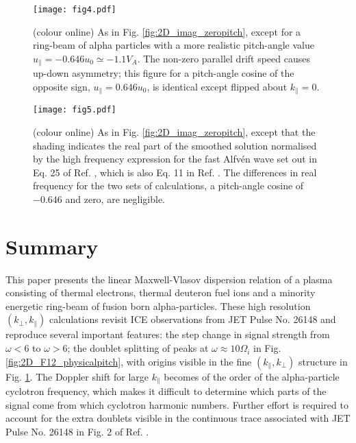 \documentclass[12pt]{iopart}
\begin{document}
\begin{figure}[ht!]
    \raggedleft
\texttt{[image: fig4.pdf]}
    \caption{(colour online) As in Fig. \ref{fig:2D_imag_zeropitch}, except for
    a ring-beam of alpha particles with a more realistic pitch-angle value
    $u_{\parallel} = -0.646 u_0 \simeq -1.1 V_A$. The non-zero parallel drift
    speed causes up-down asymmetry; this figure for a pitch-angle cosine of the
    opposite sign, $u_{\parallel} = 0.646 u_0$, is identical except flipped
    about $k_\parallel=0$.}
    \label{fig:2D_imag_physicalpitch}
\end{figure}


\begin{figure}[ht!]
    \raggedleft
\texttt{[image: fig5.pdf]}
    \caption{(colour online) As in Fig. \ref{fig:2D_imag_zeropitch}, except that
    the shading indicates the real part of the smoothed solution normalised by
    the high frequency expression for the fast Alfv{\'e}n wave set out in Eq. 25
    of Ref. \cite{Dendy1994}, which is also Eq. 11 in Ref.
    \cite{McClements1996}. The differences in real frequency for the two sets of
    calculations, a pitch-angle cosine of $-0.646$ and zero, are
    negligible.}
    \label{fig:2D_real_zeropitch}
\end{figure}

\section{Summary}

This paper presents the linear Maxwell-Vlasov dispersion relation of a plasma
consisting of thermal electrons, thermal deuteron fuel ions and a minority
energetic ring-beam of fusion born alpha-particles. These high resolution
$(k_\perp, k_\parallel)$ calculations revisit ICE observations from JET Pulse
No. 26148\cite{Cottrell1993,Dendy1995} and reproduce several important features:
the step change in signal strength from $\omega < 6$ to $\omega > 6$; the
doublet splitting of peaks at $\omega \approx 10\Omega_i$ in Fig.
\ref{fig:2D_F12_physicalpitch}, with origins visible in the fine $(k_\parallel,
k_\perp)$ structure in Fig. \ref{fig:2D_imag_physicalpitch}. The Doppler shift
for large $k_\parallel$ becomes of the order of the alpha-particle cyclotron
frequency, which makes it difficult to determine which parts of the signal come
from which cyclotron harmonic numbers. Further effort is required to account for
the extra doublets visible in the continuous trace associated with JET Pulse No.
26148 in Fig. 2 of Ref. \cite{Cottrell1993}.
\end{document}
